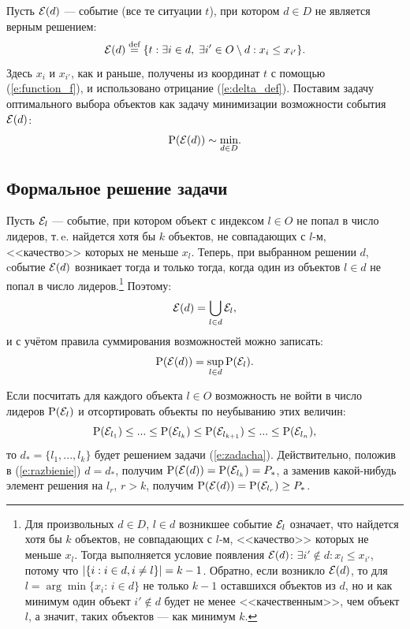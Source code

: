 \documentclass{article}
\begin{document}
Пусть $\mathcal{E}(d)$ --- событие (все те ситуации $t$), при котором $d \in D$ не является верным решением:
\begin{equation*}
  \mathcal{E}(d) \overset{\text{def}}{=} \{t: \exists i \in d,\; \exists i' \in O \setminus d: x_i \leq x_{i'}\}.
\end{equation*}
Здесь  $x_i$ и $x_{i'}$, как и раньше, получены из координат $t$ с помощью (\ref{e:function_f}), и использовано отрицание (\ref{e:delta_def}). Поставим задачу оптимального выбора объектов как задачу минимизации возможности события $\mathcal{E}(d)$:
\begin{equation}
  \label{e:zadacha}
  {\mathrm{P}}(\mathcal{E}(d)) \sim \underset{d \in D} \min.
\end{equation}

\subsection{Формальное решение задачи}

Пусть $\mathcal{E}_l$ --- событие, при котором объект с индексом $l \in O$ не попал в число лидеров, т.\,e. найдется хотя бы $k$ объектов, не совпадающих с $l$-м, <<качество>> которых не меньше $x_l$. Теперь, при выбранном решении $d$, cобытие $\mathcal{E}(d)$ возникает тогда и только тогда, когда один из объектов $l \in d$ не попал в число лидеров.\footnote{Для произвольных $d \in D$, $l \in d$ возникшее событие $\mathcal{E}_l$ означает, что найдется хотя бы $k$ объектов, не совпадающих с $l$-м, <<качество>> которых не меньше $x_l$. Тогда выполняется условие появления $\mathcal{E}(d)$: $\exists i' \notin d: x_l \leq x_{i'}$, потому что $\left| \{i: i \in d, i \neq l\} \right| = k-1$. Обратно, если возникло $\mathcal{E}(d)$, то для $l = \arg\min \{x_i:\,i \in d\}$ не только $k-1$ оставшихся объектов из $d$, но и как минимум один объект $i' \notin d$  будет не менее <<качественным>>, чем объект $l$, а значит, таких объектов --- как минимум $k$.} Поэтому: 
\begin{equation*}
  \mathcal{E}(d) = \bigcup_{l \in d} \mathcal{E}_l,
\end{equation*}
и с учётом правила суммирования возможностей можно записать:
\begin{equation}
  \label{e:razbienie}
  {\mathrm{P}}(\mathcal{E}(d)) = \sup_{l \in d} {\mathrm{P}}(\mathcal{E}_l).
\end{equation}

Если посчитать для каждого объекта $l \in O$ возможность не войти в число лидеров ${\mathrm{P}}(\mathcal{E}_l)$ и отсортировать объекты по неубыванию этих величин:
\begin{equation}
  \label{e:left_order}
  {\mathrm{P}}(\mathcal{E}_{l_1}) \leq ... \leq {\mathrm{P}}(\mathcal{E}_{l_k}) \leq {\mathrm{P}}(\mathcal{E}_{l_{k+1}}) \leq ... \leq {\mathrm{P}}(\mathcal{E}_{l_n}), 
\end{equation}
то $d_* = \{l_1, ...,  l_k\}$ будет решением задачи (\ref{e:zadacha}). Действительно, положив в (\ref{e:razbienie}) $d = d_*$, получим ${\mathrm{P}}(\mathcal{E}(d)) = {\mathrm{P}}(\mathcal{E}_{l_k}) = P_*$, а заменив какой-нибудь элемент  решения на $l_r$, $r > k$, получим ${\mathrm{P}}(\mathcal{E}(d)) = {\mathrm{P}}(\mathcal{E}_{l_r}) \geq P_*$. 
\end{document}
